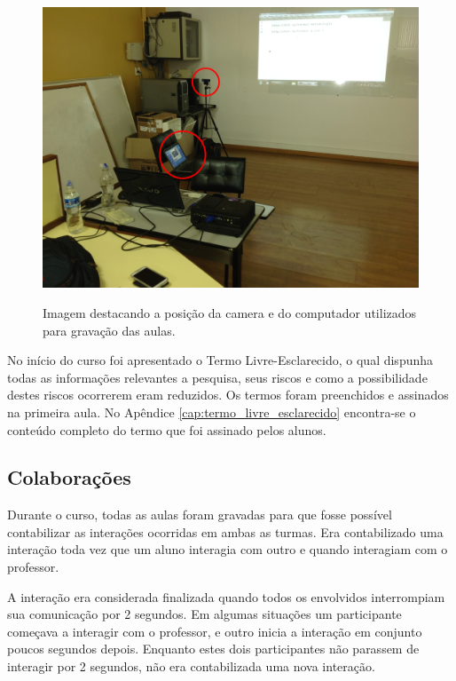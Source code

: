 \begin{figure}[!h]
\centering
\caption{Imagem destacando a posição da camera e do computador utilizados para gravação das aulas.}
\includegraphics[width=1.0\textwidth]{imgs/lab_2.jpg}
\label{fig:lab_2} 
\end{figure}

No início do curso foi apresentado o Termo Livre-Esclarecido, o qual dispunha todas as informações relevantes a pesquisa, seus riscos e como a possibilidade destes riscos ocorrerem eram reduzidos. Os termos foram preenchidos e assinados na primeira aula. No Apêndice \ref{cap:termo_livre_esclarecido} encontra-se o conteúdo completo do termo que foi assinado pelos alunos.

\subsection{Colaborações}

Durante o curso, todas as aulas foram gravadas para que fosse possível contabilizar as interações ocorridas em ambas as turmas. Era contabilizado uma interação toda vez que um aluno interagia com outro e quando interagiam com o professor.

A interação era considerada finalizada quando todos os envolvidos interrompiam sua comunicação por 2 segundos. Em algumas situações um participante começava a interagir com o professor, e outro inicia a interação em conjunto poucos segundos depois. Enquanto estes dois participantes não parassem de interagir por 2 segundos, não era contabilizada uma nova interação.

